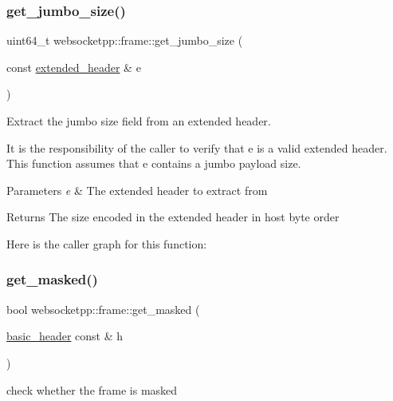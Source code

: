 \subsubsection{\texorpdfstring{get\+\_\+jumbo\+\_\+size()}{get\_jumbo\_size()}}
{\footnotesize\ttfamily uint64\+\_\+t websocketpp\+::frame\+::get\+\_\+jumbo\+\_\+size (\begin{DoxyParamCaption}\item[{const \mbox{\hyperlink{structwebsocketpp_1_1frame_1_1extended__header}{extended\+\_\+header}} \&}]{e }\end{DoxyParamCaption})\hspace{0.3cm}{\ttfamily [inline]}}



Extract the jumbo size field from an extended header. 

It is the responsibility of the caller to verify that e is a valid extended header. This function assumes that e contains a jumbo payload size.


\begin{DoxyParams}{Parameters}
{\em e} & The extended header to extract from\\
\hline
\end{DoxyParams}
\begin{DoxyReturn}{Returns}
The size encoded in the extended header in host byte order 
\end{DoxyReturn}
Here is the caller graph for this function\+:
\mbox{\label{namespacewebsocketpp_1_1frame_a4e8cf8ae88a7a8fdb2b3ea86623d01d2}} 
\subsubsection{\texorpdfstring{get\+\_\+masked()}{get\_masked()}}
{\footnotesize\ttfamily bool websocketpp\+::frame\+::get\+\_\+masked (\begin{DoxyParamCaption}\item[{\mbox{\hyperlink{structwebsocketpp_1_1frame_1_1basic__header}{basic\+\_\+header}} const \&}]{h }\end{DoxyParamCaption})\hspace{0.3cm}{\ttfamily [inline]}}



check whether the frame is masked 


